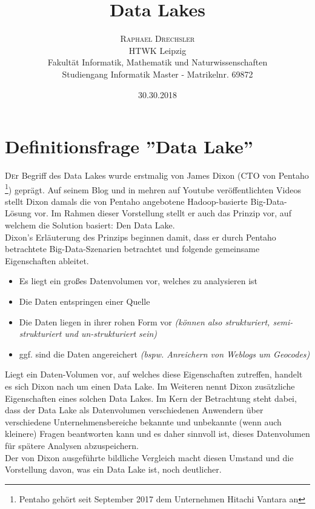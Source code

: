 \documentclass[twoside,twocolumn]{article}
\title{Data Lakes} %
\author{%
\textsc{Raphael Drechsler}\\[1ex] %
\normalsize HTWK Leipzig \\ 
\normalsize Fakultät Informatik, Mathematik und Naturwissenschaften\\ 
\normalsize Studiengang Informatik Master - Matrikelnr. 69872\\%
}
\date{30.30.2018} %
\begin{document}
\maketitle


\section{Definitionsfrage ''Data Lake''}
\lettrine[nindent=0em,lines=2]{D}er Begriff des Data Lakes wurde erstmalig von James Dixon (CTO von Pentaho \footnote{Pentaho gehört seit September 2017 dem Unternehmen Hitachi Vantara an}) geprägt. Auf seinem Blog \cite{src5}  und in mehren auf Youtube veröffentlichten Videos \cite{src6} stellt Dixon damals die von Pentaho angebotene Hadoop-basierte Big-Data-Lösung vor. Im Rahmen dieser Vorstellung stellt er auch das Prinzip vor, auf welchem die Solution basiert: Den Data Lake.\\
Dixon's Erläuterung des Prinzips beginnen damit, dass er durch Pentaho betrachtete Big-Data-Szenarien betrachtet und folgende gemeinsame Eigenschaften ableitet. 
\begin{itemize}
	\item Es liegt ein großes Datenvolumen vor, welches zu analysieren ist
	\item Die Daten entspringen einer Quelle
	\item Die Daten liegen in ihrer rohen Form vor \textit{(können also strukturiert, semi-strukturiert und un-strukturiert sein)}
	\item ggf. sind die Daten angereichert \textit{(bspw. Anreichern von Weblogs um Geocodes)}
\end{itemize}

\noindent Liegt ein Daten-Volumen vor, auf welches diese Eigenschaften zutreffen, handelt es sich Dixon nach um einen Data Lake. Im Weiteren nennt Dixon zusätzliche Eigenschaften eines solchen Data Lakes. Im Kern der Betrachtung steht dabei, dass der Data Lake als Datenvolumen verschiedenen Anwendern über verschiedene Unternehmensbereiche bekannte und unbekannte (wenn auch kleinere) Fragen beantworten kann und es daher sinnvoll ist, dieses Datenvolumen für spätere Analysen abzuspeichern.\\
Der von Dixon ausgeführte bildliche Vergleich macht diesen Umstand und die Vorstellung davon, was ein Data Lake ist, noch deutlicher.
\end{document}
